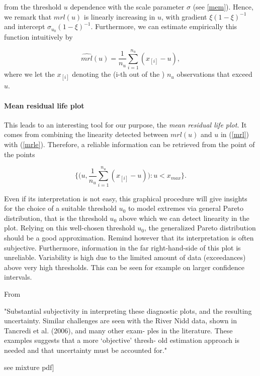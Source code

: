 \documentclass[11pt,a4paper,openany ]{book}
\begin{document}
from the threshold $u$ dependence with the scale parameter $\sigma$ (see \ref{mem}). Hence, we remark that $mrl(u)$ is linearly increasing in $u$, with gradient $\xi(1-\xi)^{-1}$ and intercept $\sigma_{u_0}(1-\xi)^{-1}$. Furthermore, we can estimate empirically this function intuitively by 

\begin{equation}\label{mrle}
\widehat{mrl}(u)=\frac{1}{n_u}\sum_{i=1}^{n_u}(x_{[i]}-u),
\end{equation}
where we let the $x_{[i]}$ denoting the (i-th out of the ) $n_u$ observations that exceed $u$.

\paragraph*{Mean residual life plot} This leads to an interesting tool for our purpose, the \emph{mean residual life plot}. It comes from combining the linearity detected between $mrl(u)$ and $u$ in (\ref{mrl}) with (\ref{mrle}). Therefore, a reliable information can be retrieved from the point of the points 

\begin{equation}
\Bigg\{\bigg(u,\frac{1}{n_u}\sum_{i=1}^{n_u}(x_{[i]}-u)\bigg):u<x_{max}\Bigg\}.
\end{equation}

Even if its interpretation is not easy, this graphical procedure will give insights for the choice of a suitable threshold $u_0$ to model extremes via general Pareto distribution, that is the threshold $u_0$ above which we can detect linearity in the plot. Relying on this well-chosen threshold $u_0$, the generalized Pareto distribution should be a good approximation.
Remind however that its interpretation is often subjective. Furthermore, information in the far right-hand-side of this plot is unreliable. Variability is high due to the limited amount of data (exceedances) above very high thresholds. This can be seen for example on larger confidence intervals.

From \cite[pp.83-84]{coles_introduction_2001} 


"Substantial subjectivity in interpreting these
diagnostic plots, and the resulting uncertainty. Similar challenges are seen with
the River Nidd data, shown in Tancredi et al. (2006), and many other exam-
ples in the literature. These examples suggests that a more ‘objective’ thresh-
old estimation approach is needed and that uncertainty must be accounted for."

see mixture pdf]
\end{document}

